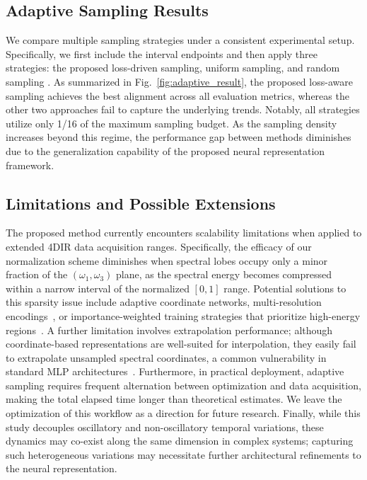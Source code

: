 \documentclass{optica-article}
\begin{document}
\subsection{Adaptive Sampling Results}
\label{ssec: adaptive}

We compare multiple sampling strategies under a consistent experimental setup. Specifically, we first include the interval endpoints and then apply three strategies: the proposed loss-driven sampling, uniform sampling, and random sampling \cite{humston2017compressively, bhattacharya2017accelerating, humston2019optimized}. As summarized in Fig.~\ref{fig:adaptive_result}, the proposed loss-aware sampling achieves the best alignment across all evaluation metrics, whereas the other two approaches fail to capture the underlying trends. Notably, all strategies utilize only 1/16 of the maximum sampling budget. As the sampling density increases beyond this regime, the performance gap between methods diminishes due to the generalization capability of the proposed neural representation framework. 

\subsection{Limitations and Possible Extensions}

The proposed method currently encounters scalability limitations when applied to extended 4DIR data acquisition ranges. Specifically, the efficacy of our normalization scheme diminishes when spectral lobes occupy only a minor fraction of the $(\omega_1, \omega_3)$ plane, as the spectral energy becomes compressed within a narrow interval of the normalized $[0,1]$ range. Potential solutions to this sparsity issue include adaptive coordinate networks, multi-resolution encodings~\cite{martel2021acorn, yu2021plenoctrees}, or importance-weighted training strategies that prioritize high-energy regions~\cite{raissi2019physics}. A further limitation involves extrapolation performance; although coordinate-based representations are well-suited for interpolation, they easily fail to extrapolate unsampled spectral coordinates, a common vulnerability in standard MLP architectures~\cite{chen2021learning, wei2024nermo}. Furthermore, in practical deployment, adaptive sampling requires frequent alternation between optimization and data acquisition, making the total elapsed time longer than theoretical estimates. We leave the optimization of this workflow as a direction for future research. Finally, while this study decouples oscillatory and non-oscillatory temporal variations, these dynamics may co-exist along the same dimension in complex systems; capturing such heterogeneous variations may necessitate further architectural refinements to the neural representation. 
\end{document}

